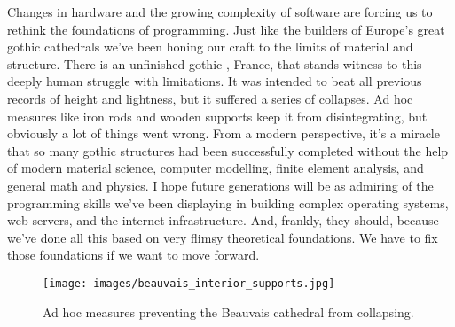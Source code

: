 Changes in hardware and the growing complexity of software are forcing
us to rethink the foundations of programming. Just like the builders of
Europe's great gothic cathedrals we've been honing our craft to the
limits of material and structure. There is an unfinished gothic
, France, that stands witness to this deeply human struggle
with limitations. It was intended to beat all previous records of height
and lightness, but it suffered a series of collapses. Ad hoc measures
like iron rods and wooden supports keep it from disintegrating, but
obviously a lot of things went wrong. From a modern perspective, it's a
miracle that so many gothic structures had been successfully completed
without the help of modern material science, computer modelling, finite
element analysis, and general math and physics. I hope future
generations will be as admiring of the programming skills we've been
displaying in building complex operating systems, web servers, and the
internet infrastructure. And, frankly, they should, because we've done
all this based on very flimsy theoretical foundations. We have to fix
those foundations if we want to move forward.

\begin{figure}
  \centering
  \texttt{[image: images/beauvais\_interior\_supports.jpg]}
  \caption{Ad hoc measures preventing the Beauvais cathedral from collapsing.}
\end{figure}
